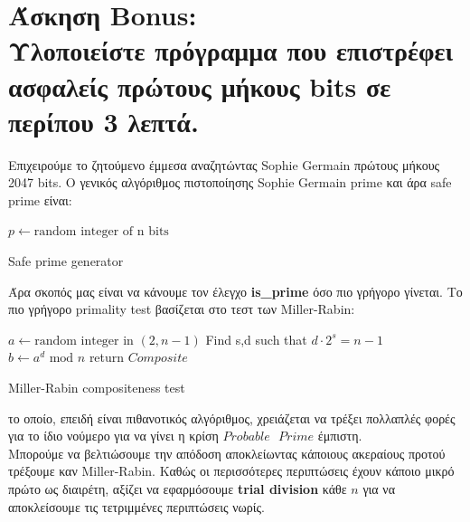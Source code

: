 \documentclass{article}
\newcommand{\lt}[1]{\latintext #1\greektext}
\newcommand{\task}[2]{\newpage\section*{Άσκηση #1:\\#2}}
\newcommand{\blt}[1]{\lt{\textbf{#1}}}
\begin{document}
\task{\lt{Bonus}}{
    Υλοποιείστε πρόγραμμα που επιστρέφει ασφαλείς πρώτους μήκους \lt{2048 bits} σε περίπου 3 λεπτά.
}
{
    Επιχειρούμε το ζητούμενο έμμεσα αναζητώντας \lt{Sophie Germain} πρώτους μήκους 2047 \lt{bits}. Ο γενικός αλγόριθμος πιστοποίησης \lt{Sophie Germain prime} και άρα \lt{safe prime} είναι:

    \begin{algorithm}
    \Large
        \latintext
        $p \gets \text{random integer of n bits}$\;
        \caption{\large Safe prime generator}
    \end{algorithm}

    \newpage

    Άρα σκοπός μας είναι να κάνουμε τον έλεγχο \blt{is\_prime} όσο πιο γρήγορο γίνεται. Το πιο γρήγορο \lt{primality test} βασίζεται στο τεστ των \lt{Miller-Rabin}:

    \begin{algorithm}
        \Large
        \latintext
        $a \gets \text{random integer in } (2, n - 1)$\;
        Find s,d such that $d\cdot 2^s = n - 1$\;
        $b \gets a^d \text{ mod } n$\;
        return $Composite$
        \caption{\large Miller-Rabin compositeness test}
    \end{algorithm}

    το οποίο, επειδή είναι πιθανοτικός αλγόριθμος, χρειάζεται να τρέξει πολλαπλές φορές για το ίδιο νούμερο για να γίνει η κρίση $Probable\text{ }Prime$ έμπιστη.\\

    Μπορούμε να βελτιώσουμε την απόδοση αποκλείωντας κάποιους ακεραίους προτού τρέξουμε καν \lt{Miller-Rabin}. Καθώς οι περισσότερες περιπτώσεις έχουν κάποιο μικρό πρώτο ως διαιρέτη, αξίζει να εφαρμόσουμε \blt{trial division} κάθε $n$ για να αποκλείσουμε τις τετριμμένες περιπτώσεις νωρίς.\\

}
\end{document}
